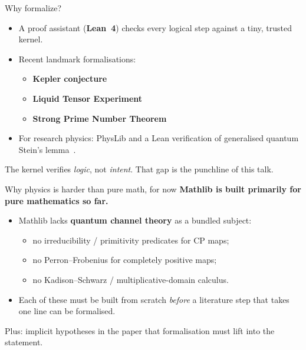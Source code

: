 \documentclass[aspectratio=169,10pt]{beamer}
\begin{document}
\begin{frame}{Why formalize?}
    \begin{itemize}
        \item A proof assistant (\textbf{Lean~4}) checks every logical step against a tiny, trusted kernel.
        \item Recent landmark formalisations:
            \begin{itemize}
                \item[$\circ$] \textbf{Kepler conjecture}~\cite{Hales2017Formal}
                \item[$\circ$] \textbf{Liquid Tensor Experiment}~\cite{Commelin2023Liquid}
                \item[$\circ$] \textbf{Strong Prime Number Theorem}~\cite{MathInc2025Strong}
            \end{itemize}
        \item For research physics: PhysLib and a Lean verification of generalised quantum Stein's lemma~\cite{Meiburg2025Formalization}.
    \end{itemize}
    \vspace{0.6em}
    \textcolor{dimwhite}{\footnotesize The kernel verifies \emph{logic}, not \emph{intent}. That gap is the punchline of this talk.}
\end{frame}

\begin{frame}{Why physics is harder than pure math, for now}
    \textcolor{leangreen}{\textbf{Mathlib is built primarily for pure mathematics so far.}}
    \vspace{0.6em}
    \begin{itemize}
        \item Mathlib lacks \textbf{quantum channel theory} as a bundled subject:
            \begin{itemize}
                \item[$\circ$] no irreducibility / primitivity predicates for CP maps;
                \item[$\circ$] no Perron--Frobenius for completely positive maps;
                \item[$\circ$] no Kadison--Schwarz / multiplicative-domain calculus.
            \end{itemize}
        \item Each of these must be built from scratch \emph{before} a literature step that takes one line can be formalised.
    \end{itemize}
    \vspace{0.6em}
    \textcolor{dimwhite}{\footnotesize Plus: implicit hypotheses in the paper that formalisation must lift into the statement.}
\end{frame}
\end{document}
